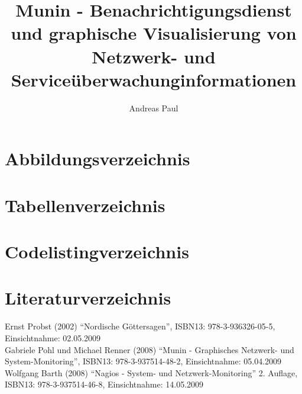 \documentclass[12pt, a4paper, headsepline]{article}
\author{Andreas Paul}
\title{Munin - Benachrichtigungsdienst und graphische Visualisierung von Netzwerk- und Serviceüberwachunginformationen}
\renewcommand{\refname}{Quellenverzeichnis}
\begin{document}
\setlength{\parindent}{0mm}

\thispagestyle{empty}
\newpage 
\renewcommand{\contentsname}{Inhalt}
\tableofcontents
\newpage

\newpage
 
\newpage
 \newpage
 \newpage
 \newpage
 \newpage
 \newpage



\section{Abbildungsverzeichnis}
\listoffigures
\newpage
\section{Tabellenverzeichnis}
\listoftables
\newpage
\renewcommand{\lstlistlistingname}{}
\section{Codelistingverzeichnis}
\lstlistoflistings
\newpage
\renewcommand{\refname}{} 
\section{Literaturverzeichnis}
\begin{thebibliography}{xxxxxx}
	 Ernst Probst (2002) "`Nordische Göttersagen"', \newline ISBN13: 978-3-936326-05-5, Einsichtnahme: 02.05.2009\\
	 
	  Gabriele Pohl und Michael Renner (2008) 
	 "`Munin - Graphisches Netzwerk- und System-Monitoring"', \newline ISBN13: 978-3-937514-48-2, Einsichtnahme: 05.04.2009\\
	 
	 Wolfgang Barth (2008) "`Nagios - System- und Netzwerk-Monitoring"' 2. Auflage, \newline ISBN13: 978-3-937514-46-8, Einsichtnahme: 14.05.2009\\
	 
\end{thebibliography}
\newpage

\end{document}
